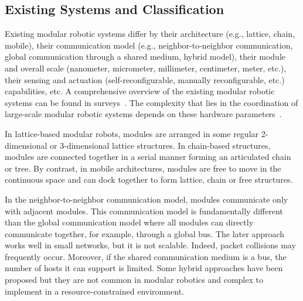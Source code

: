 \subsection{Existing Systems and Classification}
\label{section:context:classification}

Existing modular robotic systems differ by their architecture (e.g., lattice, chain, mobile), their communication model (e.g., neighbor-to-neighbor communication, global communication through a shared medium, hybrid model), their module and overall scale (nanometer, micrometer, millimeter, centimeter, meter, etc.), their sensing and actuation (self-reconfigurable, manually reconfigurable, etc.) capabilities, etc. A comprehensive overview of the existing modular robotic systems can be found in surveys~\cite{chennareddy2017modular, Ahmadzadeh:2016:MRS:2893814.2893968,yim2007modular}. The complexity that lies in the coordination of large-scale modular robotic systems depends on these hardware parameters~\cite{yim2009modular}.

In lattice-based modular robots, modules are arranged in some regular 2-dimensional or 3-dimensional lattice structures. In chain-based structures, modules are connected together in a serial manner forming an articulated chain or tree. By contrast, in mobile architectures, modules are free to move in the continuous space and can dock together to form lattice, chain or free structures.

In the neighbor-to-neighbor communication model, modules communicate only with adjacent modules. This communication model is fundamentally different than the global communication model where all modules can directly communicate together, for example, through a global bus. The later approach works well in small networks, but it is not scalable. Indeed, packet collisions may frequently occur. Moreover, if the shared communication medium is a bus, the number of hosts it can support is limited. Some hybrid approaches have been proposed but they are not common in modular robotics and complex to implement in a resource-constrained environment.

